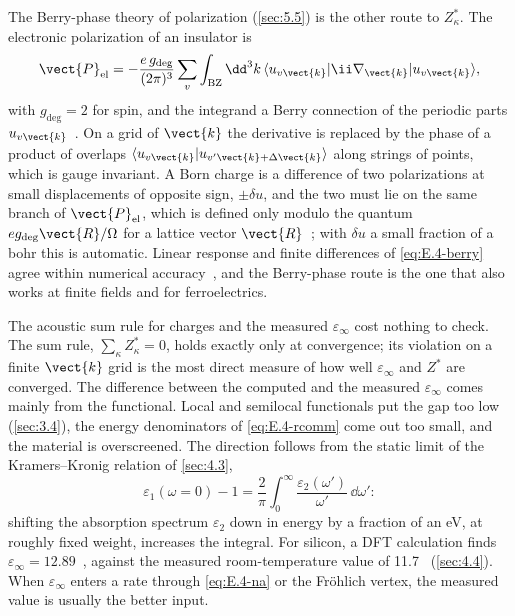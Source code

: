 The Berry-phase theory of polarization (\cref{sec:5.5}) is the other route to $Z^*_\kappa$. The electronic polarization of an insulator is
\begin{equation}
  \vect{P}_{\mathrm{el}} = -\frac{e\,g_{\mathrm{deg}}}{(2\pi)^3}\sum_{v}\int_{\mathrm{BZ}}\dd^3k\,\langle u_{v\vect{k}}|\ii\nabla_{\vect{k}}|u_{v\vect{k}}\rangle ,
  \label{eq:E.4-berry}
\end{equation}
with $g_{\mathrm{deg}} = 2$ for spin, and the integrand a Berry connection of the periodic parts $u_{v\vect{k}}$~\cite[Eqs.~(89)--(90)]{marzari2012maximally}. On a grid of $\vect{k}$ the derivative is replaced by the phase of a product of overlaps $\langle u_{v\vect{k}}|u_{v'\vect{k}+\Delta\vect{k}}\rangle$ along strings of points, which is gauge invariant. A Born charge is a difference of two polarizations at small displacements of opposite sign, $\pm\delta u$, and the two must lie on the same branch of $\vect{P}_{\mathrm{el}}$, which is defined only modulo the quantum $e g_{\mathrm{deg}}\vect{R}/\Omega$ for a lattice vector $\vect{R}$~\cite[Sect.~V.A.1]{marzari2012maximally}; with $\delta u$ a small fraction of a bohr this is automatic. Linear response and finite differences of \cref{eq:E.4-berry} agree within numerical accuracy~\cite[Sect.~II.D.2]{baroni2001phonons}, and the Berry-phase route is the one that also works at finite fields and for ferroelectrics.

The acoustic sum rule for charges and the measured $\varepsilon_\infty$ cost nothing to check. The sum rule, $\sum_\kappa Z^*_\kappa = 0$, holds exactly only at convergence; its violation on a finite $\vect{k}$ grid is the most direct measure of how well $\varepsilon_\infty$ and $Z^*$ are converged. The difference between the computed and the measured $\varepsilon_\infty$ comes mainly from the functional. Local and semilocal functionals put the gap too low (\cref{sec:3.4}), the energy denominators of \cref{eq:E.4-rcomm} come out too small, and the material is overscreened. The direction follows from the static limit of the Kramers--Kronig relation of \cref{sec:4.3},
\begin{equation}
  \varepsilon_1(\omega = 0) - 1 = \frac{2}{\pi}\int_0^\infty\frac{\varepsilon_2(\omega')}{\omega'}\,\dd\omega' :
  \label{eq:E.4-kk}
\end{equation}
shifting the absorption spectrum $\varepsilon_2$ down in energy by a fraction of an eV, at roughly fixed weight, increases the integral. For silicon, a DFT calculation finds $\varepsilon_\infty = 12.89$~\cite{ponce2018towards}, against the measured room-temperature value of 11.7~\cite{franta2017temperature} (\cref{sec:4.4}). When $\varepsilon_\infty$ enters a rate through \cref{eq:E.4-na} or the Fr\"ohlich vertex, the measured value is usually the better input.

